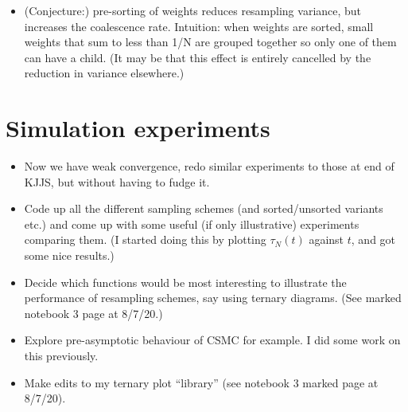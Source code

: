 \documentclass{article}
\begin{document}
\begin{itemize}
\item (Conjecture:) pre-sorting of weights reduces resampling variance, but increases the coalescence rate. Intuition: when weights are sorted, small weights that sum to less than 1/N are grouped together so only one of them can have a child. (It may be that this effect is entirely cancelled by the reduction in variance elsewhere.)
\end{itemize}

\section*{Simulation experiments}
\begin{itemize}
\item Now we have weak convergence, redo similar experiments to those at end of KJJS, but without having to fudge it.
\item Code up all the different sampling schemes (and sorted/unsorted variants etc.) and come up with some useful (if only illustrative) experiments comparing them. (I started doing this by plotting $\tau_N(t)$ against $t$, and got some nice results.)
\item Decide which functions would be most interesting to illustrate the performance of resampling schemes, say using ternary diagrams. (See marked notebook 3 page at 8/7/20.)
\item Explore pre-asymptotic behaviour of CSMC for example. I did some work on this previously.
\item Make edits to my ternary plot ``library'' (see notebook 3 marked page at 8/7/20).
\end{itemize}
\end{document}
